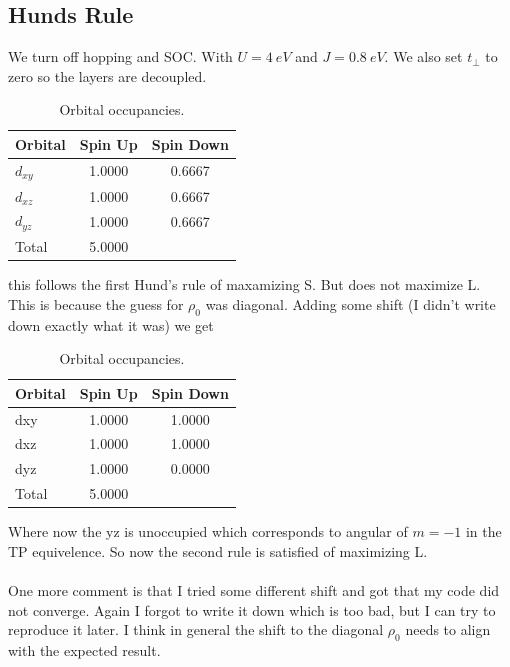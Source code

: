 \documentclass[11pt]{article}
\begin{document}
\subsection{Hunds Rule}
We turn off hopping and SOC. With $U=4~eV$ and $J=0.8~eV$. We also set $t_\perp$ to zero
so the layers are decoupled.
\begin{table}[h]
\centering
\begin{tabular}{lcc}
\hline
Orbital & Spin Up & Spin Down \\
\hline
$d_{xy}$ & 1.0000 & 0.6667 \\
$d_{xz}$ & 1.0000 & 0.6667 \\
$d_{yz}$ & 1.0000 & 0.6667 \\
\hline
Total & 5.0000 & \\
\hline
\end{tabular}
\caption{Orbital occupancies.}
\label{tab:occupancy}
\end{table}
this follows the first Hund's rule of maxamizing S. But does not maximize L. This is because
the guess for $\rho_0$ was diagonal. Adding some shift (I didn't write down exactly what it was)
we get
\begin{table}[h]
\centering
\begin{tabular}{lcc}
\hline
Orbital & Spin Up & Spin Down \\
\hline
dxy & 1.0000 & 1.0000 \\
dxz & 1.0000 & 1.0000 \\
dyz & 1.0000 & 0.0000 \\
\hline
Total & 5.0000 & \\
\hline
\end{tabular}
\caption{Orbital occupancies.}
\label{tab:occupancy}
\end{table}
Where now the yz is unoccupied which corresponds to angular of $m=-1$ in the TP equivelence.
So now the second rule is satisfied of maximizing L.
\\\\
One more comment is that I tried some different shift and got that my code did not converge.
Again I forgot to write it down which is too bad, but I can try to reproduce it later.
I think in general the shift to the diagonal $\rho_0$ needs to align with the expected result.
\end{document}
